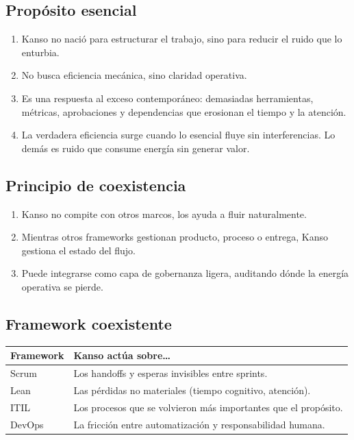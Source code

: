 \subsection*{Propósito esencial}
\begin{enumerate}
    \item Kanso no nació para estructurar el trabajo, sino para reducir el ruido que lo enturbia.
    \item No busca eficiencia mecánica, sino claridad operativa.
    \item Es una respuesta al exceso contemporáneo: demasiadas herramientas, métricas, aprobaciones y dependencias que erosionan el tiempo y la atención.
    \item La verdadera eficiencia surge cuando lo esencial fluye sin interferencias. Lo demás es ruido que consume energía sin generar valor.
\end{enumerate}

\subsection*{Principio de coexistencia}
\begin{enumerate}
    \item Kanso no compite con otros marcos, los ayuda a fluir naturalmente.
    \item Mientras otros frameworks gestionan producto, proceso o entrega, Kanso gestiona el estado del flujo.
    \item Puede integrarse como capa de gobernanza ligera, auditando dónde la energía operativa se pierde.
\end{enumerate}

\subsection*{Framework coexistente}

\begin{tabular}{|l|p{8cm}|}
\hline
\textbf{Framework} & \textbf{Kanso actúa sobre\ldots} \\ \hline
Scrum & Los handoffs y esperas invisibles entre sprints. \\ \hline
Lean & Las pérdidas no materiales (tiempo cognitivo, atención). \\ \hline
ITIL & Los procesos que se volvieron más importantes que el propósito. \\ \hline
DevOps & La fricción entre automatización y responsabilidad humana. \\ \hline
\end{tabular}


